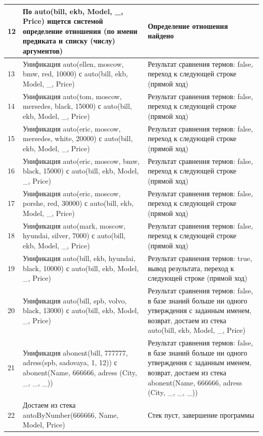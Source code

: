 \documentclass[a4paper,14pt]{extreport} %
\begin{document}
\begin{enumerate}
\begin{enumerate}
\begin{longtable}{|p{1.1cm}|p{8.5cm}|p{7cm}|}
	12 & По auto(bill, ekb, Model, \_, Price) ищется системой определение отношения (по имени предиката и списку (числу) аргументов) & Определение отношения найдено \\ \hline
	13 & Унификация auto(ellen, moscow, bmw, red, 10000) с auto(bill, ekb, Model, \_, Price) & Результат сравнения термов: false, переход к следующей строке (прямой ход) \\ \hline
	14 & Унификация auto(tom, moscow, mersedes, black, 15000) с auto(bill, ekb, Model, \_, Price) & Результат сравнения термов: false, переход к следующей строке (прямой ход) \\ \hline
	15 & Унификация auto(eric, moscow, mersedes, white, 20000) с auto(bill, ekb, Model, \_, Price) & Результат сравнения термов: false, переход к следующей строке (прямой ход) \\ \hline
	16 & Унификация auto(eric, moscow, bmw, black, 15000) с auto(bill, ekb, Model, \_, Price) & Результат сравнения термов: false, переход к следующей строке (прямой ход) \\ \hline
	17 & Унификация auto(eric, moscow, porshe, red, 30000) с auto(bill, ekb, Model, \_, Price) & Результат сравнения термов: false, переход к следующей строке (прямой ход) \\ \hline
	18 & Унификация auto(mark, moscow, hyundai, silver, 7000) с auto(bill, ekb, Model, \_, Price) & Результат сравнения термов: false, переход к следующей строке (прямой ход) \\ \hline
	19 & Унификация auto(bill, ekb, hyundai, black, 10000) с auto(bill, ekb, Model, \_, Price) & Результат сравнения термов: true, вывод результата, переход к следующей строке (прямой ход) \\ \hline
	20 & Унификация auto(bill, spb, volvo, black, 13000) с auto(bill, ekb, Model, \_, Price) & Результат сравнения термов: false, в базе знаний больше ни одного утверждения с заданным именем, возврат, достаем из стека auto(bill, ekb, Model, \_, Price) \\ \hline
	21 & Унификация abonent(bill, 777777, adress(spb, sadovaya, 1, 12)) с abonent(Name, 666666, adress (City, \_, \_, \_)) & Результат сравнения термов: false, в базе знаний больше ни одного утверждения с заданным именем, возврат, достаем из стека abonent(Name, 666666, adress (City, \_, \_, \_)) \\ \hline
	22 & Достаем из стека autoByNumber(666666, Name, Model, Price) & Стек пуст, завершение программы \\ \hline
\end{longtable}


\end{enumerate}
\end{enumerate}
\end{document}
